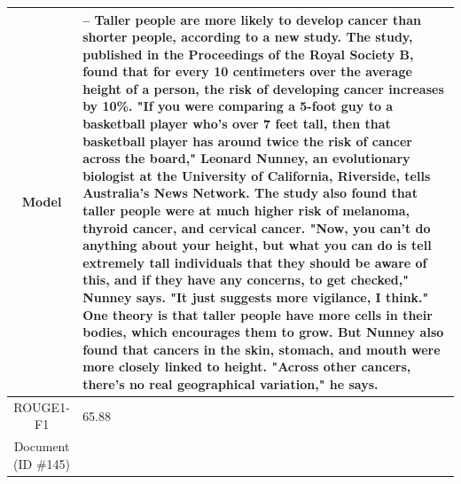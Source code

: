 \begin{table}[bth!]
\begin{tabular}{c|p{}}
\\ \hline
Model & 
– Taller people are more likely to develop cancer than shorter people, according to a new study. The study, published in the Proceedings of the Royal Society B, found that for every 10 centimeters over the average height of a person, the risk of developing cancer increases by 10\%. "If you were comparing a 5-foot guy to a basketball player who's over 7 feet tall, then that basketball player has around twice the risk of cancer across the board," Leonard Nunney, an evolutionary biologist at the University of California, Riverside, tells Australia's News Network. The study also found that taller people were at much higher risk of melanoma, thyroid cancer, and cervical cancer. "Now, you can't do anything about your height, but what you can do is tell extremely tall individuals that they should be aware of this, and if they have any concerns, to get checked," Nunney says. "It just suggests more vigilance, I think." One theory is that taller people have more cells in their bodies, which encourages them to grow. But Nunney also found that cancers in the skin, stomach, and mouth were more closely linked to height. "Across other cancers, there's no real geographical variation," he says.
\\ \hline
ROUGE1-F1 & 
65.88
\\ \hline
\makecell{Document\\(ID \#145)} & 

\end{tabular}
\end{table}

